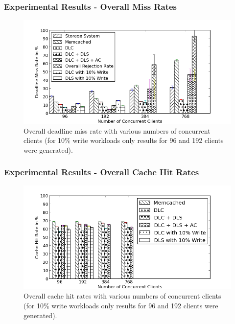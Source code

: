 \documentclass{beamer}
\begin{document}
\begin{frame}
\frametitle{Experimental Results - Overall Miss Rates}
\begin{figure}[t]
\begin{center}
\centerline{\includegraphics[scale=0.5]{img/EC2/EC2_BAR/miss_bar.png}}
\caption{Overall deadline miss rate with various numbers of concurrent clients (for 10\% write workloads
only results for 96 and 192 clients were generated).}
\label{fig:bar_miss}
\end{center}
\end{figure}
\end{frame}

\begin{frame}
\frametitle{Experimental Results - Overall Cache Hit Rates}
\begin{figure}[t]
\begin{center}
\centerline{\includegraphics[scale=0.5]{img/EC2/EC2_BAR/cache_bar.png}}
\caption{Overall cache hit rates with various numbers of concurrent clients (for 10\% write workloads
only results for 96 and 192 clients were generated).}
\label{fig:bar_cache}
\end{center}
\end{figure}
\end{frame}
\end{document}
